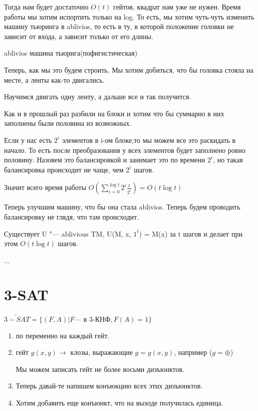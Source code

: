 Тогда нам будет достаточно $O(t)$ гейтов, квадрат нам уже не нужен. 
Время работы мы хотим испортить только на log.  То есть,
мы хотим чуть-чуть изменить машину тьюринга в ablivios, то 
есть в ту, в которой положение головки не зависит от входа,
а зависит только от его длины. 

ablivios машина тьюрига(пофигистическая)

Теперь, как мы это будем строить. 
Мы хотим добиться, что бы головка стояла на месте, а ленты как-то двигались. 

Научимся двигать одну ленту, а дальше все и так получится. 

Как и в прошлый раз разбили на блоки и хотим что бы суммарно в них заполнены были половина из 
возможных. 

Если у нас есть $2^i$ элементов в i-ом блоке,то мы можем все это раскидать в начало. 
То есть после преобразования у всех элементов будет заполнено ровно половину. Назовем это
балансировкой и занимает это по времени $2^i$, но такая балансировка происходит 
не чаще, чем $2^i$ шагов. 

Значит всего время работы $O(\sum_{i = 0}^{\log t}2^i \frac{t}{2^i}) = O(t\log t)$

Теперь улучшим машину, что бы она стала ablivios. Теперь будем проводить 
балансировку не глядя, что там происходит. 

\begin{lemma}
Существует U "--- ablivious TM, U(M, x, $1^t$) = M(x) за t шагов и 
делает при этом $O(t\log t)$ шагов. 
\end{lemma}
\begin{conseq}
...
\end{conseq}


\section{3-SAT}
$\tilde{3-SAT} = \{(F, A)|F \text{--- в 3-КНФ}, F(A) = 1\}$
 
\begin{enumerate}
 \item по переменно на каждый гейт. 
 \item гейт $g(x, y) \to$ клозы, выражающие $g = g(x, y)$, 
 например ($g = \oplus$)
 
 Мы можем записать гейт не более восьми дизъюнктов. 
 \item 
 Теперь давай-те напишем конъюкцию всех этих дизъюнктов. 
 \item 
 Хотим добавить еще конъюнкт, что на выходе получилась единица. 
\end{enumerate}

